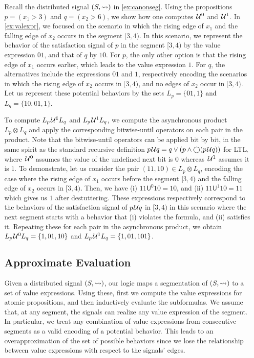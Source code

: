 \begin{example} \label{ex:bitwiseuntil}
	Recall the distributed signal $(S, {\rightsquigarrow})$ in \cref{ex:canonseg}.
	Using the propositions $p = (x_1 > 3)$ and $q = (x_2 > 6)$, we show how one computes $\kern.1em\mathcal{U}^0$ and $\kern.1em\mathcal{U}^1$.
	In \cref{ex:valexpr}, we focused on the scenario in which the rising edge of $x_1$ and the falling edge of $x_2$ occurs in the segment $[3,4)$.
	In this scenario, we represent the behavior of the satisfaction signal of $p$ in the segment $[3,4)$ by the value expression $01$, and that of $q$ by $10$.
	For $p$, the only other option is that the rising edge of $x_1$ occurs earlier, which leads to the value expression $1$.
	For $q$, the alternatives include the expressions $01$ and $1$, respectively encoding the scenarios in which the rising edge of $x_2$ occurs in $[3,4)$, and no edges of $x_2$ occur in $[3,4)$.
	Let us represent these potential behaviors by the sets $L_p = \{ 01, 1 \}$ and $L_q = \{ 10, 01, 1\}$.

	To compute $L_p \kern.1em\mathcal{U}^0 L_q$ and $L_p \kern.1em\mathcal{U}^1 L_q$, we compute the asynchronous product $L_p \otimes L_q$ and apply the corresponding bitwise-until operators on each pair in the product.
	Note that the bitwise-until operators can be applied bit by bit, in the same spirit as the standard recursive definition $p \kern.1em\mathcal{U} q = q \lor (p \land \bigcirc (p \kern.1em\mathcal{U} q))$ for LTL, where $\kern.1em\mathcal{U}^0$ assumes the value of the undefined next bit is $0$ whereas $\kern.1em\mathcal{U}^1$ assumes it is $1$.
	To demonstrate, let us consider the pair $(11,10) \in L_p \otimes L_q$, encoding the case where the rising edge of $x_1$ occurs before the segment $[3,4)$ and the falling edge of $x_2$ occurs in $[3,4)$.
	Then, we have (i) $11 \mathsf{U}^0 10 = 10$, and (ii) $11 \mathsf{U}^1 10 = 11$ which gives us $1$ after destuttering.
	These expressions respectively correspond to the behaviors of the satisfaction signal of $p \kern.1em\mathcal{U} q$ in $[3,4)$ in this scenario where the next segment starts with a behavior that (i) violates the formula, and (ii) satisfies it.
	Repeating these for each pair in the asynchronous product, we obtain $L_p \kern.1em\mathcal{U}^0 L_q = \{1, 01, 10 \}$ and $L_p \kern.1em\mathcal{U}^1 L_q = \{1, 01, 101 \}$.
\end{example}

\subsection{Approximate Evaluation}
Given a distributed signal $(S,{\rightsquigarrow})$, our logic maps a segmentation of $(S,{\rightsquigarrow})$ to a set of value expressions.
Using these, first we compute the value expressions for atomic propositions, and then inductively evaluate the subformulas.
We assume that, at any segment, the signals can realize any value expression of the segment.
In particular, we treat any combination of value expressions from consecutive segments as a valid encoding of a potential behavior.
This leads to an overapproximation of the set of possible behaviors since we lose the relationship between value expressions with respect to the signals' edges.

